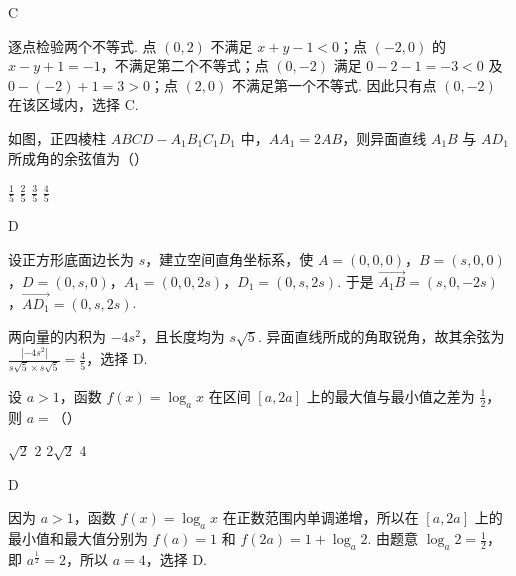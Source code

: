 \begin{answer}
C
\end{answer}

\begin{solution}
逐点检验两个不等式. 点 \((0,2)\) 不满足 \(x+y-1<0\)；点 \((-2,0)\) 的
\(x-y+1=-1\)，不满足第二个不等式；点 \((0,-2)\) 满足
\(0-2-1=-3<0\) 及 \(0-(-2)+1=3>0\)；点 \((2,0)\) 不满足第一个不等式. 因此只有点 \((0,-2)\) 在该区域内，选择 C.
\end{solution}

\begin{problem}
如图，正四棱柱 \(ABCD - A_{1}B_{1}C_{1}D_{1}\) 中，\(AA_{1} = 2AB\)，则异面直线 \(A_{1}B\) 与 \(AD_{1}\) 所成角的余弦值为（\quad）


\choices
    {\(\frac{1}{5}\)}
    {\(\frac{2}{5}\)}
    {\(\frac{3}{5}\)}
    {\(\frac{4}{5}\)}
\end{problem}

\begin{answer}
D
\end{answer}

\begin{solution}
设正方形底面边长为 \(s\)，建立空间直角坐标系，使
\(A=(0,0,0)\)，\(B=(s,0,0)\)，\(D=(0,s,0)\)，\(A_1=(0,0,2s)\)，\(D_1=(0,s,2s)\). 于是
\(\overrightarrow{A_1B}=(s,0,-2s)\)，\(\overrightarrow{AD_1}=(0,s,2s)\).

两向量的内积为 \(-4s^2\)，且长度均为 \(s\sqrt{5}\). 异面直线所成的角取锐角，故其余弦为
\(\frac{\left|-4s^2\right|}{s\sqrt{5}\times s\sqrt{5}}=\frac{4}{5}\)，选择 D.
\end{solution}

\begin{problem}
设 \(a > 1\)，函数 \(f(x) = \log_a x\) 在区间 \([a, 2a]\) 上的最大值与最小值之差为 \(\frac{1}{2}\)，则 \(a =\)（\quad）

\choices
    {\(\sqrt{2}\)}
    {\(2\)}
    {\(2\sqrt{2}\)}
    {\(4\)}
\end{problem}

\begin{answer}
D
\end{answer}

\begin{solution}
因为 \(a>1\)，函数 \(f(x)=\log_a x\) 在正数范围内单调递增，所以在 \([a,2a]\) 上的最小值和最大值分别为
\(f(a)=1\) 和 \(f(2a)=1+\log_a2\). 由题意
\(\log_a2=\frac{1}{2}\)，即 \(a^{\frac{1}{2}}=2\)，所以 \(a=4\)，选择 D.
\end{solution}

